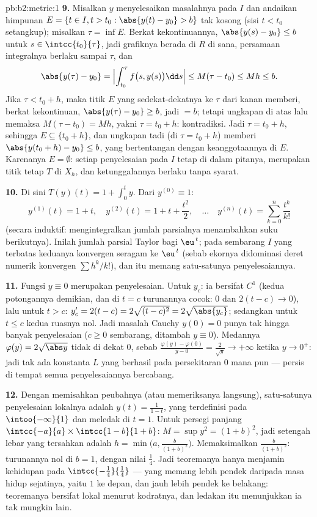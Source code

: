 \begin{solution}{pb:b2:metric:1}
\textbf{9.} Misalkan $y$ menyelesaikan masalahnya pada $I$ dan andaikan
himpunan $E = \{t \in I, t > t_0 : \abs{y(t) - y_0} > b\}$ tak kosong
(sisi $t < t_0$ setangkup); misalkan $\tau = \inf E$. Berkat
kekontinuannya, $\abs{y(s) - y_0} \leq b$ untuk $s \in
\intcc{t_0}{\tau}$, jadi grafiknya berada di $R$ di sana, persamaan
integralnya berlaku sampai $\tau$, dan
\[
\abs{y(\tau) - y_0} = \Bigl|\int_{t_0}^{\tau}f\bigl(s,
y(s)\bigr)\dd s\Bigr| \leq M(\tau - t_0) \leq Mh \leq b .
\]
Jika $\tau < t_0 + h$, maka titik $E$ yang sedekat-dekatnya ke $\tau$
dari kanan memberi, berkat kekontinuan, $\abs{y(\tau) - y_0} \geq
b$, jadi $= b$; tetapi ungkapan di atas lalu memaksa $M(\tau - t_0) =
Mh$, yakni $\tau = t_0 + h$: kontradiksi. Jadi $\tau = t_0 + h$,
sehingga $E \subseteq \{t_0 + h\}$, dan ungkapan tadi (di $\tau = t_0 +
h$) memberi $\abs{y(t_0 + h) - y_0} \leq b$, yang bertentangan dengan
keanggotaannya di $E$. Karenanya $E = \emptyset$: setiap penyelesaian
pada $I$ tetap di dalam pitanya, merupakan titik tetap $T$ di $X_h$, dan
ketunggalannya berlaku tanpa syarat.

\textbf{10.} Di sini $T(y)(t) = 1 + \int_0^t y$. Dari $y^{(0)} \equiv
1$:
\[
y^{(1)}(t) = 1 + t,\quad
y^{(2)}(t) = 1 + t + \frac{t^2}2,\quad\dots\quad
y^{(n)}(t) = \sum_{k=0}^{n}\frac{t^k}{k!}
\]
(secara induktif: mengintegralkan jumlah parsialnya menambahkan suku
berikutnya). Inilah jumlah parsial Taylor bagi $\eu^{\,t}$; pada
sembarang $I$ yang terbatas keduanya konvergen seragam ke $\eu^{\,t}$
(sebab ekornya didominasi deret numerik konvergen $\sum h^k/k!$),
dan itu memang satu-satunya penyelesaiannya.

\textbf{11.} Fungsi $y \equiv 0$ merupakan penyelesaian. Untuk $y_c$: ia
bersifat $C^1$ (kedua potongannya demikian, dan di $t = c$ turunannya
cocok: $0$ dan $2(t - c) \to 0$), lalu untuk $t > c$: $y_c' = 2(t - c) =
2\sqrt{(t-c)^2} = 2\sqrt{\abs{y_c}}$; sedangkan untuk $t \leq c$ kedua
ruasnya nol. Jadi masalah Cauchy $y(0) = 0$ punya tak hingga banyak
penyelesaian ($c \geq 0$ sembarang, ditambah $y \equiv 0$). Medannya
$\varphi(y) = 2\sqrt{\abs y}$ tidak  di dekat $0$, sebab
$\frac{\varphi(y) - \varphi(0)}{y - 0} = \frac{2}{\sqrt y} \to
+\infty$ ketika $y \to 0^+$: jadi tak ada konstanta $L$ yang berhasil
pada persekitaran $0$ mana pun --- persis di tempat semua penyelesaiannya
bercabang.

\textbf{12.} Dengan memisahkan peubahnya (atau memeriksanya langsung),
satu-satunya penyelesaian lokalnya adalah $y(t) = \frac1{1 - t}$, yang
terdefinisi pada $\intoo{-\infty}{1}$ dan meledak di $t = 1$. Untuk
persegi panjang $\intcc{-a}{a} \times \intcc{1 - b}{1 + b}$: $M =
\sup y^2 = (1 + b)^2$, jadi setengah lebar yang tersahkan adalah $h =
\min\bigl(a, \frac{b}{(1+b)^2}\bigr)$. Memaksimalkan
$\frac{b}{(1+b)^2}$: turunannya nol di $b = 1$, dengan nilai
$\frac14$. Jadi teoremanya hanya menjamin kehidupan pada
$\intcc{-\frac14}{\frac14}$ --- yang memang lebih pendek daripada masa
hidup sejatinya, yaitu $1$ ke depan, dan jauh lebih pendek ke belakang:
teoremanya bersifat lokal menurut kodratnya, dan ledakan itu menunjukkan
ia tak mungkin lain.


\end{solution}
